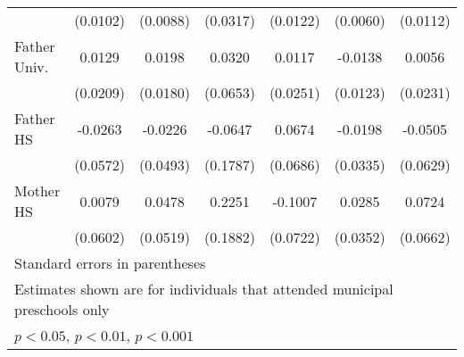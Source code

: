 \begin{table}[htbp]
\begin{tabular}{l*{6}{c}}
            &    (0.0102)         &    (0.0088)         &    (0.0317)         &    (0.0122)         &    (0.0060)         &    (0.0112)         \\
\addlinespace
Father Univ.&      0.0129         &      0.0198         &      0.0320         &      0.0117         &     -0.0138         &      0.0056         \\
            &    (0.0209)         &    (0.0180)         &    (0.0653)         &    (0.0251)         &    (0.0123)         &    (0.0231)         \\
\addlinespace
Father HS   &     -0.0263         &     -0.0226         &     -0.0647         &      0.0674         &     -0.0198         &     -0.0505         \\
            &    (0.0572)         &    (0.0493)         &    (0.1787)         &    (0.0686)         &    (0.0335)         &    (0.0629)         \\
\addlinespace
Mother HS   &      0.0079         &      0.0478         &      0.2251         &     -0.1007         &      0.0285         &      0.0724         \\
            &    (0.0602)         &    (0.0519)         &    (0.1882)         &    (0.0722)         &    (0.0352)         &    (0.0662)         \\
\bottomrule
\multicolumn{7}{l}{\footnotesize Standard errors in parentheses}\\
\multicolumn{7}{l}{\footnotesize Estimates shown are for individuals that attended municipal preschools only}\\
\multicolumn{7}{l}{\footnotesize \sym{*} \(p<0.05\), \sym{**} \(p<0.01\), \sym{***} \(p<0.001\)}\\
\end{tabular}
\end{table}
